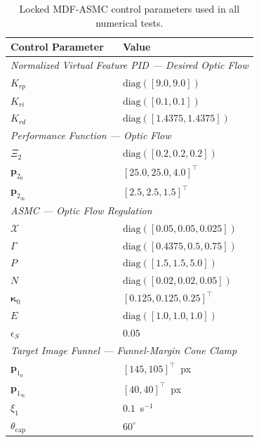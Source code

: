 \documentclass[10pt,journal]{IEEEtran}
\begin{document}
\begin{table}[!t]
    \centering
    \caption{Locked MDF-ASMC control parameters used in all numerical tests.}
    \label{sup:control params}
    \begin{tabular}{ll}
    \toprule
        \textbf{Control Parameter} & \textbf{Value}\\
    \midrule
        \multicolumn{2}{l}{\textit{Normalized Virtual Feature PID --- Desired Optic Flow}} \\
        $K_{rp}$ & $\text{diag}([9.0,9.0])$ \\
        $K_{ri}$ & $\text{diag}([0.1,0.1])$ \\
        $K_{rd}$ & $\text{diag}([1.4375,1.4375])$ \\
    \midrule
        \multicolumn{2}{l}{\textit{Performance Function --- Optic Flow}} \\
        $\Xi_2$                     & $\text{diag}([0.2,0.2,0.2])$ \\
        $\boldsymbol{p}_{2_0}$      & $[25.0,25.0,4.0]^\top$ \\
        $\boldsymbol{p}_{2_\infty}$ & $[2.5,2.5,1.5]^\top$ \\
    \midrule
        \multicolumn{2}{l}{\textit{ASMC --- Optic Flow Regulation}} \\
        $\mathcal{X}$           & $\text{diag}([0.05,0.05,0.025])$ \\
        $\Gamma$                & $\text{diag}([0.4375,0.5,0.75])$ \\
        $P$                     & $\text{diag}([1.5,1.5,5.0])$ \\
        $N$                     & $\text{diag}([0.02,0.02,0.05])$ \\
        $\boldsymbol{\kappa}_0$ & $[0.125,0.125,0.25]^\top$ \\
        $E$                     & $\text{diag}([1.0,1.0,1.0])$ \\
        $\epsilon_S$            & $0.05$ \\
    \midrule
        \multicolumn{2}{l}{\textit{Target Image Funnel --- Funnel-Margin Cone Clamp}} \\
        $\boldsymbol{p}_{1_0}$      & $[145,105]^\top$~px \\
        $\boldsymbol{p}_{1_\infty}$ & $[40,40]^\top$~px \\
        $\xi_1$                     & $0.1$~s$^{-1}$ \\
        $\theta_\text{cap}$         & $60^\circ$ \\
    \midrule

\end{tabular}
\end{table}
\end{document}
